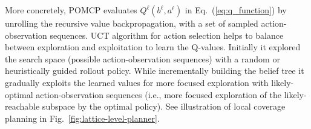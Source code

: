 \documentclass[letterpaper]{article} %
\newcommand{\phdone}[1]{} %
\begin{document}
\phdone{POMCP Details}
More concretely, POMCP evaluates $Q^\ell(b^\ell, a^\ell)$ in Eq.~(\ref{eq:q_function}) by unrolling the recursive value backpropagation, with a set of sampled action-observation sequences.
UCT algorithm for action selection helps to balance between exploration and exploitation to learn the Q-values.
Initially it explored the search space (possible action-observation sequences) with a random or heuristically guided rollout policy.
While incrementally building the belief tree it gradually exploits the learned values for more focused exploration with likely-optimal action-observation sequences (i.e., more focused exploration of the likely-reachable subspace by the optimal policy).
See illustration of local coverage planning in Fig.~\ref{fig:lattice-level-planner}.




\end{document}

